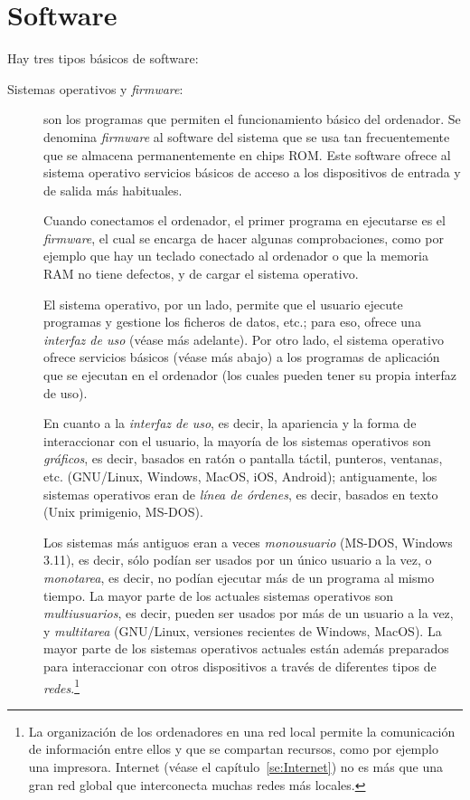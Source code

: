 \section{Software} \label{ss:programari} 

Hay tres tipos básicos de software: 

\begin{description} \item[Sistemas operativos y \emph{firmware}:] son los programas que permiten el funcionamiento básico del ordenador. Se denomina \emph{firmware} al software del sistema que se usa tan frecuentemente que se almacena permanentemente en chips ROM. Este software ofrece al sistema operativo servicios básicos de acceso a los dispositivos de entrada y de salida más habituales. 

Cuando conectamos el ordenador, el primer programa en ejecutarse es el \emph{firmware}, el cual se encarga de hacer algunas comprobaciones, como por ejemplo que hay un teclado conectado al ordenador o que la memoria RAM no tiene defectos, y de cargar el sistema operativo. 

El sistema operativo, por un lado, permite que el usuario ejecute programas y gestione los ficheros de datos, etc.; para eso, ofrece una \emph{interfaz de uso} (véase más adelante). Por otro lado, el sistema operativo ofrece servicios básicos (véase más abajo) a los programas de aplicación que se ejecutan en el ordenador (los cuales pueden tener su propia interfaz de uso). 

En cuanto a la \emph{interfaz de uso}, es decir, la apariencia y la forma de interaccionar con el usuario, la mayoría de los sistemas operativos son \emph{gráficos}, es decir, basados en ratón o pantalla táctil, punteros, ventanas, etc. (GNU/Linux, Windows, MacOS, iOS, Android); antiguamente, los sistemas operativos eran de {\em línea de órdenes}, es decir, basados en texto (Unix primigenio, MS-DOS). 

Los sistemas más antiguos eran a veces \emph{monousuario} (MS-DOS, Windows 3.11), es decir, sólo podían ser usados por un único usuario a la vez, o \emph{monotarea}, es decir, no podían ejecutar más de un programa al mismo tiempo. La mayor parte de los actuales sistemas operativos son \emph{multiusuarios}, es decir, pueden ser usados por más de un usuario a la vez, y \emph{multitarea} (GNU/Linux, versiones recientes de Windows, MacOS). La mayor parte de los sistemas operativos actuales están además preparados para interaccionar con otros dispositivos a través de diferentes tipos de \emph{redes}.\footnote{La organización de los ordenadores en una red local permite la comunicación de información entre ellos y que se compartan recursos, como por ejemplo una impresora. Internet (véase el capítulo~\ref{se:Internet}) no es más que una gran red global que interconecta muchas redes más locales.} 


\end{description}
